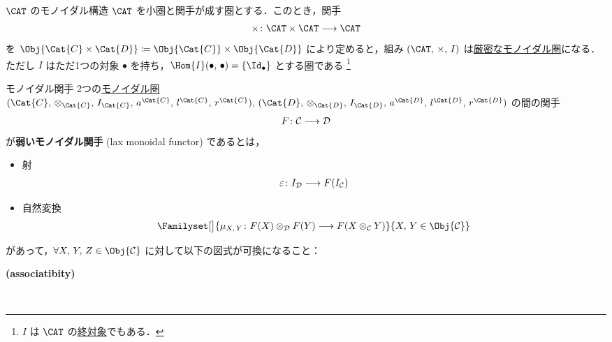 \documentclass[TQFT_main]{subfiles}
\begin{document}
    \begin{myexample}[label=ex:Cat-monidal]{$\CAT$ のモノイダル構造}
        $\CAT$ を小圏と関手が成す圏とする．このとき，関手
        \begin{align}
            \times \colon \CAT \times \CAT \lto \CAT
        \end{align}
        を $\Obj{\Cat{C} \times \Cat{D}} \coloneqq \Obj{\Cat{C}} \times \Obj{\Cat{D}}$ により定めると，組み $(\CAT,\, \times,\, I)$ は\hyperref[redef:monoidal-category]{厳密なモノイダル圏}になる．ただし $I$ はただ1つの対象 $\bullet$ を持ち，$\Hom{I}(\bullet,\,\bullet) = \{\Id_{\bullet}\}$ とする圏である
        \footnote{$I$ は $\CAT$ の\hyperref[def:colim]{終対象}でもある．}
    \end{myexample}

    \begin{mydef}[label=redef:monidal-functor,breakable]{モノイダル関手}
        2つの\hyperref[def:monoidal-category]{モノイダル圏} $(\Cat{C},\, \otimes_{\Cat{C}},\, I_{\Cat{C}},\, a^{\Cat{C}},\, l^{\Cat{C}},\, r^{\Cat{C}}),\, (\Cat{D},\, \otimes_{\Cat{D}},\, I_{\Cat{D}},\, a^{\Cat{D}},\, l^{\Cat{D}},\, r^{\Cat{D}})$ の間の関手
        \begin{align}
            F \colon \mathcal{C} \longrightarrow \mathcal{D}
        \end{align}
        が\textbf{弱いモノイダル関手} (lax monoidal functor) であるとは，
        \begin{itemize}
            \item 射
            \begin{align}
                \varepsilon \colon I_{\mathcal{D}} \longrightarrow F(I_{\mathcal{C}})
            \end{align}
            
            \item 自然変換
            \begin{align}
                \Familyset[\big]{\mu_{X,\, Y} \colon F(X) \otimes_{\mathcal{D}} F(Y) \lto F(X \otimes_{\mathcal{C}} Y)}{X,\, Y \in \Obj{\mathcal{C}}}
            \end{align}
        \end{itemize}
        があって，$\forall X,\, Y,\, Z \in \Obj{\mathcal{C}}$ に対して以下の図式が可換になること：
        \begin{description}
            \item[\textbf{(associatibity)}]　
            

\end{description}
\end{mydef}
\end{document}
